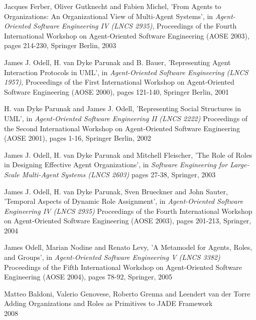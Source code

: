 \begin{thebibliography}{99}
Jacques Ferber, Oliver Gutknecht and Fabien Michel,
'From Agents to Organizations: An Organizational View of Multi-Agent Systems',
in \textit{Agent-Oriented Software Engineering IV (LNCS 2935)},
Proceedings of the Fourth International Workshop on Agent-Oriented Software Engineering (AOSE 2003),
pages 214-230,
Springer Berlin, 2003


James J. Odell, H. van Dyke Parunak and B. Bauer,
'Representing Agent Interaction Protocols in UML',
in \textit{Agent-Oriented Software Engineering (LNCS 1957)},
Proceedings of the First International Workshop on Agent-Oriented Software Engineering (AOSE 2000),
pages 121-140,
Springer Berlin, 2001

H. van Dyke Parunak and James J. Odell,
'Representing Social Structures in UML',
in \textit{Agent-Oriented Software Engineering II (LNCS 2222)}
Proceedings of the Second International Workshop on Agent-Oriented Software Engineering (AOSE 2001),
pages 1-16,
Springer Berlin, 2002

James J. Odell, H. van Dyke Parunak and Mitchell Fleischer,
'The Role of Roles in Designing Effective Agent Organizations',
in \textit{Software Engineering for Large-Scale Multi-Agent Systems (LNCS 2603)}
pages 27-38,
Springer, 2003

James J. Odell, H. van Dyke Parunak, Sven Brueckner and John Sauter,
'Temporal Aspects of Dynamic Role Assignment',
in \textit{Agent-Oriented Software Engineering IV (LNCS 2935)}
Proceedings of the Fourth International Workshop on Agent-Oriented Software Engineering (AOSE 2003),
pages 201-213,
Springer, 2004

James Odell, Marian Nodine and Renato Levy,
'A Metamodel for Agents, Roles, and Groups',
in \textit{Agent-Oriented Software Engineering V (LNCS 3382)}
Proceedings of the Fifth International Workshop on Agent-Oriented Software Engineering (AOSE 2004),
pages 78-92,
Springer, 2005


Matteo Baldoni, Valerio Genovese, Roberto Grenna and Leendert van der Torre\\
Adding Organizations and Roles as Primitives to JADE Framework\\
2008


\end{thebibliography}
